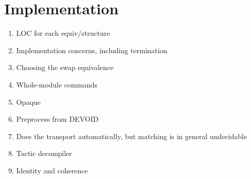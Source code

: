 \section{Implementation}

\begin{enumerate}
\item LOC for each equiv/structure
\item Implementation concerns, including termination
\item Choosing the swap equivalence
\item Whole-module commands
\item Opaque
\item Preprocess from DEVOID
\item Does the transport automatically, but matching is in general undecidable
\item Tactic decompiler
\item Identity and coherence
\end{enumerate}
